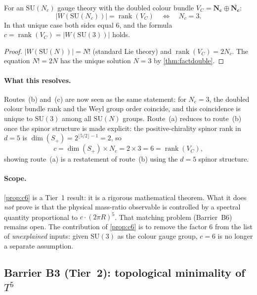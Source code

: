 \begin{proposition}[Uniqueness of $c=6$]
  \label{prop:c6}
  For an $\mathrm{SU}(N_c)$ gauge theory with the doubled colour bundle
  $V_C = \mathbf{N_c}\oplus\overline{\mathbf{N_c}}$:
  \begin{equation}
    \label{eq:c6unique}
    |W(\mathrm{SU}(N_c))| = \operatorname{rank}(V_C)
    \quad\Longleftrightarrow\quad N_c = 3.
  \end{equation}
  In that unique case both sides equal $6$, and the formula
  $c = \operatorname{rank}(V_C) = |W(\mathrm{SU}(3))|$ holds.
\end{proposition}

\begin{proof}
$|W(\mathrm{SU}(N))| = N!$ (standard Lie theory) and
$\operatorname{rank}(V_C) = 2N_c$.
The equation $N! = 2N$ has the unique solution $N=3$ by
\cref{thm:factdouble}.
\end{proof}

\paragraph{What this resolves.}
Routes~(b) and~(c) are now seen as the same statement: for $N_c=3$,
the doubled colour bundle rank and the Weyl group order coincide, and
this coincidence is unique to $\mathrm{SU}(3)$ among all
$\mathrm{SU}(N)$ groups.  Route~(a) reduces to route~(b) once the
spinor structure is made explicit: the positive-chirality spinor rank
in $d=5$ is $\dim(S_+) = 2^{\lfloor 5/2\rfloor - 1} = 2$, so
\[
  c = \dim(S_+)\times N_c = 2\times 3 = 6 = \operatorname{rank}(V_C),
\]
showing route~(a) is a restatement of route~(b) using the $d=5$ spinor
structure.

\paragraph{Scope.}
\cref{prop:c6} is a Tier~1 result: it is a rigorous mathematical
theorem.  What it does \emph{not} prove is that the physical mass-ratio
observable is controlled by a spectral quantity proportional to
$c\cdot(2\pi R)^5$.  That matching problem (Barrier~B6) remains open.
The contribution of \cref{prop:c6} is to remove the factor $6$ from
the list of \emph{unexplained} inputs: given $\mathrm{SU}(3)$ as the
colour gauge group, $c=6$ is no longer a separate assumption.

\subsection{Barrier B3 (Tier~2): topological minimality of $T^5$}
\label{ssec:B3}

